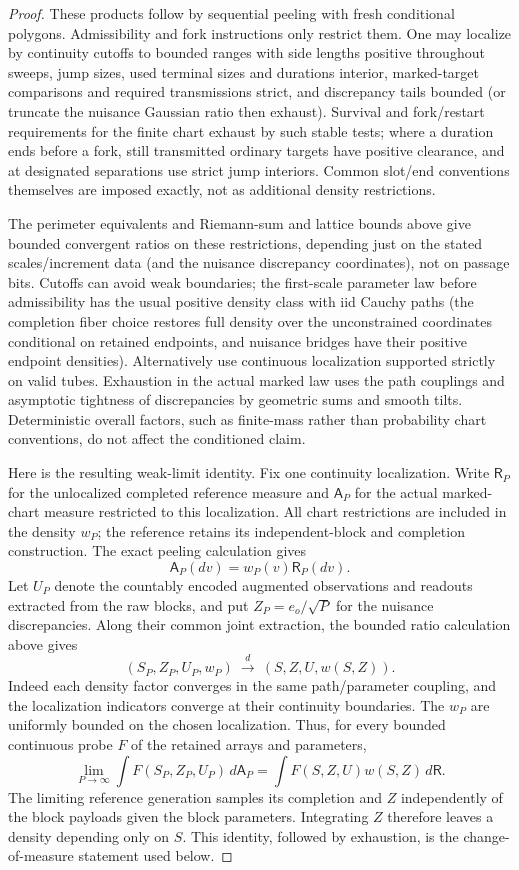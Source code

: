 \begin{proof}
These products follow by sequential peeling with fresh conditional polygons. Admissibility and fork
instructions only restrict them. One may localize by continuity cutoffs to bounded ranges with side lengths
positive throughout sweeps, jump sizes, used terminal sizes and durations interior, marked-target
comparisons and required transmissions strict, and discrepancy tails bounded (or truncate the nuisance
Gaussian ratio then exhaust). Survival and fork/restart requirements for the finite chart exhaust by such
stable tests; where a duration ends before a fork, still transmitted ordinary targets have positive
clearance, and at designated separations use strict jump interiors. Common slot/end conventions themselves
are imposed exactly, not as additional density restrictions.

The perimeter equivalents and Riemann-sum and
lattice bounds above give bounded convergent ratios on these restrictions, depending just on the stated
scales/increment data (and the nuisance discrepancy coordinates), not on passage bits. Cutoffs can avoid
weak boundaries; the first-scale parameter law before admissibility has the usual positive density class
with iid Cauchy paths (the completion fiber choice restores full density over the unconstrained coordinates
conditional on retained endpoints, and nuisance bridges have their positive endpoint densities).
Alternatively use continuous localization supported strictly on valid tubes. Exhaustion in the actual marked
law uses the path couplings and asymptotic tightness of discrepancies by geometric sums and smooth tilts.
Deterministic overall factors, such as finite-mass rather than probability chart conventions, do not affect
the conditioned claim.

Here is the resulting weak-limit identity. Fix one continuity localization.
Write $\mathsf R_P$ for the unlocalized completed reference measure and
$\mathsf A_P$ for the actual marked-chart measure restricted to this
localization. All chart restrictions are included in the density $w_P$;
the reference retains its independent-block and completion construction. The exact peeling calculation gives
\[
 \mathsf A_P(dv)=w_P(v)\mathsf R_P(dv).
\]
Let $U_P$ denote the countably encoded augmented observations and readouts
extracted from the raw blocks, and put $Z_P=e_o/\sqrt P$ for the nuisance
discrepancies. Along their common joint extraction, the bounded ratio
calculation above gives
\[
 (S_P,Z_P,U_P,w_P)\ \xrightarrow{\ d\ }\ (S,Z,U,w(S,Z)).
\]
Indeed each density factor converges in the same path/parameter coupling,
and the localization indicators converge at their continuity boundaries.
The $w_P$ are uniformly bounded on the chosen localization. Thus, for every
bounded continuous probe $F$ of the retained arrays and parameters,
\[
 \lim_{P\to\infty}\int F(S_P,Z_P,U_P)\,d\mathsf A_P
   =\int F(S,Z,U)w(S,Z)\,d\mathsf R.
\]
The limiting reference generation samples its completion and $Z$ independently
of the block payloads given the block parameters. Integrating $Z$ therefore
leaves a density depending only on $S$. This identity, followed by exhaustion,
is the change-of-measure statement used below.

\end{proof}


